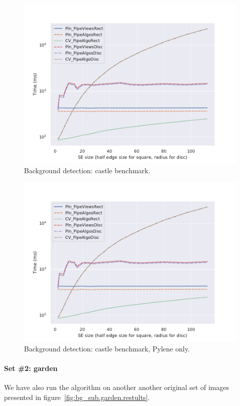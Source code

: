 \begin{figure}[tbh]
  \centering
  \includegraphics[width=.7\linewidth]{figs/bench/PlnVsOpenCV_bg_sub_0}

  \caption{Background detection: castle benchmark.}
  \label{fig:bg_sub.castle.benchmarks}
\end{figure}

\begin{figure}[tbh]
  \centering
  \includegraphics[width=.7\linewidth]{figs/bench/PlnVsOpenCV_bg_sub_0}

  \caption{Background detection: castle benchmark, Pylene only.}
  \label{fig:bg_sub.castle.benchmarks.plnonly}
\end{figure}

\paragraph{Set \#2: garden} We have also run the algorithm on another another original set of images presented in
figure~\ref{fig:bg_sub.garden.restults}.


